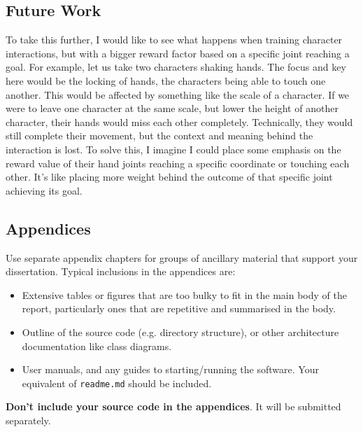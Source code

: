 \documentclass{l4proj}
\begin{document}
\section{Future Work}
To take this further, I would like to see what happens when training character interactions, but with a bigger reward factor based on a specific joint reaching a goal. For example, let us take two characters shaking hands. The focus and key here would be the locking of hands, the characters being able to touch one another. This would be affected by something like the scale of a character. If we were to leave one character at the same scale, but lower the height of another character, their hands would miss each other completely. Technically, they would still complete their movement, but the context and meaning behind the interaction is lost. To solve this, I imagine I could place some emphasis on the reward value of their hand joints reaching a specific coordinate or touching each other. It's like placing more weight behind the outcome of that specific joint achieving its goal.

%
% 

\begin{appendices}

\chapter{Appendices}

Use separate appendix chapters for groups of ancillary material that support your dissertation. 
Typical inclusions in the appendices are:

\begin{itemize}
\item
  Extensive tables or figures that are too bulky to fit in the main body of
  the report, particularly ones that are repetitive and summarised in the body.
\item Outline of the source code (e.g. directory structure), 
    or other architecture documentation like class diagrams.
\item User manuals, and any guides to starting/running the software. 
Your equivalent of \texttt{readme.md} should be included.

\end{itemize}

\textbf{Don't include your source code in the appendices}. It will be
submitted separately.



\end{appendices}
\end{document}
